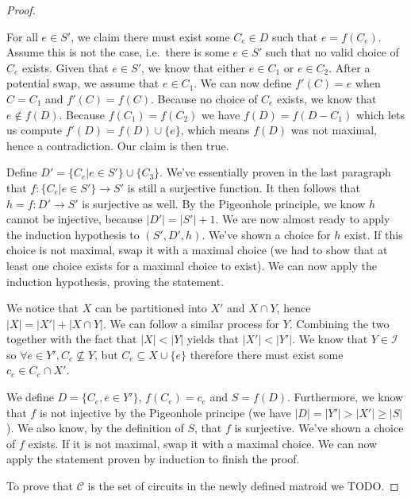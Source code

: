 \begin{proof}
\begin{enumerate}
\begin{enumerate}
            For all $e \in S'$, we claim there must exist some $C_e \in D$ such that $e = f(C_e)$. Assume this is not the case, i.e.\ there is some $e \in S'$ such that no valid choice of $C_e$ exists. Given that $e \in S'$, we know that either $e \in C_1$ or $e \in C_2$. After a potential swap, we assume that $e \in C_1$. We can now define $f'(C) = e$ when $C = C_1$ and $f'(C) = f(C)$. Because no choice of $C_e$ exists, we know that $e \not\in f(D)$. Because $f(C _1 ) = f(C _2 )$ we have $f(D) = f(D - C _1 )$ which lets us compute $f'(D) = f(D) \cup \{e\}$, which means $f(D)$ was not maximal, hence a contradiction. Our claim is then true.

            Define $D' = \{C_e | e \in S'\} \cup \{C _3 \}$. We've essentially proven in the last paragraph that $f : \{C_e | e \in S'\} \to S'$ is still a  surjective function. It then follows that $h = f : D' \to S'$ is surjective as well. By the Pigeonhole principle, we know $h$ cannot be injective, because $|D'| = |S'| + 1$. We are now almost ready to apply the induction hypothesis to $(S', D', h)$. We've shown a choice for $h$ exist. If this choice is not maximal, swap it with a maximal choice (we had to show that at least one choice exists for a maximal choice to exist). We can now apply the induction hypothesis, proving the statement.
    \end{enumerate}

    We notice that $X$ can be partitioned into $X'$ and $X \cap Y$, hence $|X| = |X'| + |X \cap Y|$. We can follow a similar process for $Y$. Combining the two together with the fact that $|X| < |Y|$ yields that $|X'| < |Y'|$. We know that $Y \in \mathcal I$ so $\forall e \in Y', C_e \not \subseteq  Y$, but $C_e \subseteq  X \cup \{e\}$ therefore there must exist some $c_e \in C_e \cap X'$. 

    We define $D = \{C_e, e \in Y'\}$, $f(C_e) = c_e$ and $S = f(D)$. Furthermore, we know that $f$ is not injective by the Pigeonhole principe (we have $|D| = |Y'| > |X'| \geq |S|$). We also know, by the definition of $S$, that $f$ is surjective. We've shown a choice of $f$ exists. If it is not maximal, swap it with a maximal choice. We can now apply the statement proven by induction to finish the proof.
\end{enumerate}

To prove that $\mathcal C $ is the set of circuits in the newly defined matroid we TODO.

\end{proof}

